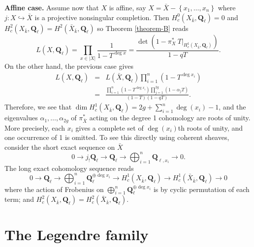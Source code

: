 \medskip\noindent
{\bf Affine case.}
Assume now that $X$ is affine, say $X= \bar X-\left\{x_1, \ldots, x_n\right\}$
where $j: X \hookrightarrow \bar X$ is a projective nonsingular completion.
Then $H_c^0(X_{\bar k}, \mathbf{Q}_\ell) = 0$ and $H_c^2(X_{\bar k},
\mathbf{Q}_\ell) = H^2(\bar X_{\bar k}, \mathbf{Q}_\ell)$ so
Theorem \ref{theorem-B}
reads
$$
L(X, \mathbf{Q}_\ell) = \prod_{x\in |X|}\frac{1}{1-T^{\deg x}} =
\frac{\det\left(1-\pi_X^*\ T\big|_{H_c^1(X_{\bar k},
\mathbf{Q}_\ell)}\right)}{1-qT}.
$$
On the other hand, the previous case gives
\begin{eqnarray*}
L(X, \mathbf{Q}_\ell) & = & L(\bar X,
\mathbf{Q}_\ell)\prod_{i=1}^n\left(1-T^{\deg x_i}\right) \\
& = & \frac{\prod_{i=1}^n(1-T^{\deg
x_i})\prod_{j=1}^{2g}(1-\alpha_jT)}{(1-T)(1-qT)}.
\end{eqnarray*}
Therefore, we see that $\dim H_c^1(X_{\bar k}, \mathbf{Q}_\ell) =
2g+\sum_{i=1}^n \deg(x_i)-1$, and the eigenvalues $\alpha_1, \ldots,
\alpha_{2g}$ of $\pi_{\bar X}^*$ acting on the degree 1 cohomology are roots of
unity. More precisely, each $x_i$ gives a complete set of $\deg(x_i)$th roots
of unity, and one occurrence of 1 is omitted. To see this directly using
coherent sheaves, consider the short exact sequence on $\bar X$
$$
0\to j_!\mathbf{Q}_\ell\to \mathbf{Q}_\ell\to\bigoplus_{i=1}^n
\mathbf{Q}_{\ell, x_i}\to 0.
$$
The long exact cohomology sequence reads
$$
0\to \mathbf{Q}_\ell \to \bigoplus_{i=1}^n \mathbf{Q}_\ell^{\oplus \deg x_i}
\to H_c^1(X_{\bar k}, \mathbf{Q}_\ell) \to H_c^1(\bar X_{\bar k},
\mathbf{Q}_\ell)\to 0
$$
where the action of Frobenius on $\bigoplus_{i=1}^n \mathbf{Q}_\ell^{\oplus
\deg x_i}$ is by cyclic permutation of each term; and $H_c^2(X_{\bar k},
\mathbf{Q}_\ell) = H_c^2(\bar X_{\bar k}, \mathbf{Q}_\ell)$.






\section{The Legendre family}
\label{section-legendre-family}

